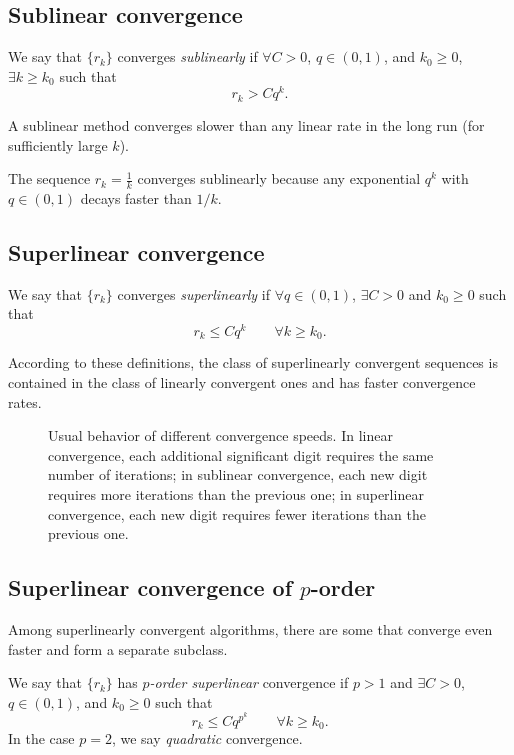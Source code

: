 \subsection{Sublinear convergence}
\begin{definition}
We say that $\{r_k\}$ converges \emph{sublinearly} if $\forall C>0$, $q\in(0,1)$, and
$k_0\ge 0$, $\exists k\ge k_0$ such that
\[
  r_k > Cq^{k}.
\]
\end{definition}
A sublinear method converges slower than any linear rate in the long run (for sufficiently large $k$).

\begin{example}
  The sequence $r_k = \frac{1}{k}$ converges sublinearly because any exponential $q^k$ with
  $q\in(0,1)$ decays faster than $1/k$.
\end{example}

\subsection{Superlinear convergence}
\begin{definition}
We say that $\{r_k\}$ converges \emph{superlinearly} if
$\forall q\in(0,1)$, $\exists C>0$ and $k_0\ge 0$ such that
\[
  r_k \le C q^{k}\qquad \forall k \ge k_0.
\]
\end{definition}
According to these definitions, the class of superlinearly convergent sequences is contained in the
class of linearly convergent ones and has faster convergence rates.
\begin{figure}[ht]
    \centering
    \caption{Usual behavior of different convergence speeds. In linear convergence, each additional
    significant digit requires the same number of iterations; in sublinear convergence, each
    new digit requires more iterations than the previous one; in superlinear convergence, each new
    digit requires fewer iterations than the previous one.}
    \label{fig:behaviour-of-convergence-speeds}
\end{figure}


\subsection{Superlinear convergence of \texorpdfstring{$p$}{p}-order}
Among superlinearly convergent algorithms, there are some that converge even faster and form a
separate subclass.
\begin{definition}
We say that $\{r_k\}$ has \emph{$p$-order superlinear} convergence if 
$p > 1$ and $\exists C>0$, $q \in (0,1)$, and $k_0 \ge0$ such that
\[
  r_{k}\le C q^{p^{k}} \qquad \forall k\ge k_0.
\]
In the case $p=2$, we say \emph{quadratic} convergence.
\end{definition}


